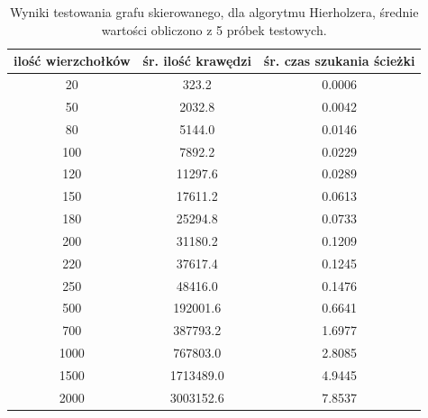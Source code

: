 \documentclass[a4paper, 12pt, twoside, openright]{article}
\begin{document}
\begin{table}[!p]
	\centering
	\caption{Wyniki testowania grafu skierowanego, dla algorytmu Hierholzera, średnie wartości obliczono z 5 próbek testowych.}
	
	\resizebox{16cm}{!}
	{
		\begin{tabular}{|c c c|}
			\hline
			ilość wierzchołków	& śr. ilość krawędzi 		& śr. czas szukania ścieżki\\ \hline \hline
			20 	& 323.2  		& 0.0006 	\\ \hline
			50 	& 2032.8 		& 0.0042 	\\ \hline
			80 	& 5144.0        & 0.0146	\\ \hline
			100 & 7892.2        & 0.0229	\\ \hline
			120 & 11297.6       & 0.0289	\\ \hline
			150 & 17611.2 		& 0.0613	\\ \hline
			180 & 25294.8       & 0.0733	\\ \hline
			200 & 31180.2  		& 0.1209	\\ \hline
			220 & 37617.4 		& 0.1245	\\ \hline
			250 & 48416.0   	& 0.1476	\\ \hline
			500 & 192001.6   	& 0.6641	\\ \hline				
			700 & 387793.2		& 1.6977	\\ \hline
			1000& 767803.0	    & 2.8085	\\ \hline
			1500& 1713489.0	    & 4.9445	\\ \hline
			2000& 3003152.6	  	& 7.8537	\\ \hline
		\end{tabular} 
	}
	\label{Tab:Hie_DiG}
\end{table}




\end{document}
